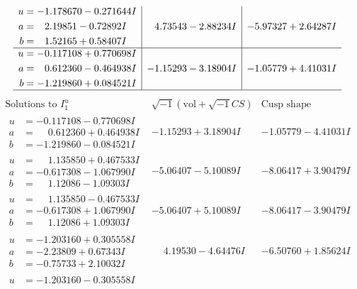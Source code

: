 \documentclass[1p]{elsarticle_modified}
\theoremstyle{definition}
\newcommand{\I}{\sqrt{-1}}
\begin{document}
$$\begin{array}{c|c|c}
\begin{aligned}
u &= -1.178670 - 0.271644 I \\
a &= \phantom{-}2.19851 - 0.72892 I \\
b &= \phantom{-}1.52165 + 0.58407 I\end{aligned}
 & \phantom{-}4.73543 - 2.88234 I & -5.97327 + 2.64287 I \\ \hline\begin{aligned}
u &= -0.117108 + 0.770698 I \\
a &= \phantom{-}0.612360 - 0.464938 I \\
b &= -1.219860 + 0.084521 I\end{aligned}
 & -1.15293 - 3.18904 I & -1.05779 + 4.41031 I\\
 \hline 
 \end{array}$$\newpage$$\begin{array}{c|c|c}  
\text{Solutions to }I^u_{1}& \I (\text{vol} + \sqrt{-1}CS) & \text{Cusp shape}\\
 \hline 
\begin{aligned}
u &= -0.117108 - 0.770698 I \\
a &= \phantom{-}0.612360 + 0.464938 I \\
b &= -1.219860 - 0.084521 I\end{aligned}
 & -1.15293 + 3.18904 I & -1.05779 - 4.41031 I \\ \hline\begin{aligned}
u &= \phantom{-}1.135850 + 0.467533 I \\
a &= -0.617308 - 1.067990 I \\
b &= \phantom{-}1.12086 - 1.09303 I\end{aligned}
 & -5.06407 - 5.10089 I & -8.06417 + 3.90479 I \\ \hline\begin{aligned}
u &= \phantom{-}1.135850 - 0.467533 I \\
a &= -0.617308 + 1.067990 I \\
b &= \phantom{-}1.12086 + 1.09303 I\end{aligned}
 & -5.06407 + 5.10089 I & -8.06417 - 3.90479 I \\ \hline\begin{aligned}
u &= -1.203160 + 0.305558 I \\
a &= -2.23809 + 0.67343 I \\
b &= -0.75733 + 2.10032 I\end{aligned}
 & \phantom{-}4.19530 - 4.64476 I & -6.50760 + 1.85624 I \\ \hline\begin{aligned}
u &= -1.203160 - 0.305558 I \\

\end{aligned}
\end{array}$$
\end{document}
